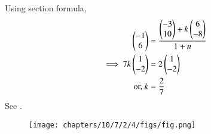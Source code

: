 Using section formula,
\begin{align}
         \begin{pmatrix}-1\\6\end{pmatrix} &=\frac{{\begin{pmatrix}-3\\10\end{pmatrix}+k\begin{pmatrix}6\\-8\end{pmatrix}}}{1+n}\\
	 \implies 7k\begin{pmatrix}1 \\ -2\end{pmatrix} &= 2\begin{pmatrix}1 \\ -2\end{pmatrix}
	 \\
	 \text{or, } k &= \frac{2}{7}
\end{align}
See .
\begin{figure}[H]
 \begin{center}
  \texttt{[image: chapters/10/7/2/4/figs/fig.png]}
 \end{center}
\caption{}
\label{fig:10/7/2/4Fig1}
\end{figure}
